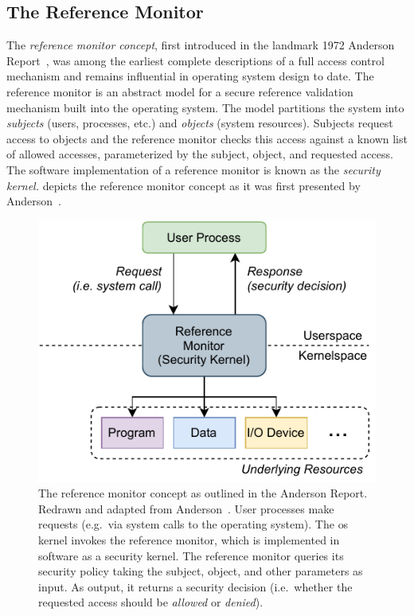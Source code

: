 \subsection{The Reference Monitor}%
\label{ss:refmon}

The \textit{reference monitor concept}, first introduced in the landmark 1972 Anderson
Report~\cite{anderson1972_report}, was among the earliest complete descriptions of a full
access control mechanism and remains influential in operating system design to date. The
reference monitor is an abstract model for a secure reference validation mechanism built
into the operating system. The model partitions the system into \textit{subjects} (users,
processes, etc.) and \textit{objects} (system resources).  Subjects request access to
objects and the reference monitor checks this access against a known list of allowed
accesses, parameterized by the subject, object, and requested access. The software
implementation of a reference monitor is known as the \textit{security kernel.}
 depicts the reference monitor concept as it was first presented by
Anderson~\cite{anderson1972_report}.

\begin{figure}[htbp]
  \centering
  \includegraphics[width=0.6\linewidth]{figs/background/refmon.pdf}
  \caption[The reference monitor concept]{
    The reference monitor concept as outlined in the Anderson Report. Redrawn and adapted
    from Anderson~\cite{anderson1972_report}. User processes make requests (e.g.\ via
    system calls to the operating system). The \gls{os} kernel invokes the reference
    monitor, which is implemented in software as a security kernel. The reference monitor
    queries its security policy taking the subject, object, and other parameters as input.
    As output, it returns a security decision (i.e.\ whether the requested access should be
    \textit{allowed} or \textit{denied}).
  }%
  \label{fig:refmon}
\end{figure}

